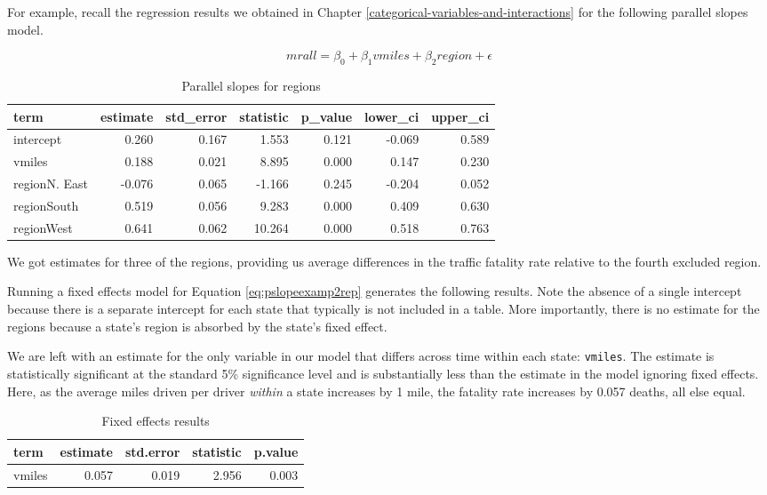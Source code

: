 \documentclass[
]{book}
\begin{document}
For example, recall the regression results we obtained in Chapter \ref{categorical-variables-and-interactions} for the following parallel slopes model.

\begin{equation}
mrall = \beta_0 + \beta_1vmiles + \beta_2region + \epsilon
\label{eq:pslopeexamp2rep}
\end{equation}

\begin{table}

\caption{\label{tab:psloperesults2rep}Parallel slopes for regions}
\centering
\begin{tabular}[t]{l|r|r|r|r|r|r}
\hline
term & estimate & std\_error & statistic & p\_value & lower\_ci & upper\_ci\\
\hline
intercept & 0.260 & 0.167 & 1.553 & 0.121 & -0.069 & 0.589\\
\hline
vmiles & 0.188 & 0.021 & 8.895 & 0.000 & 0.147 & 0.230\\
\hline
regionN. East & -0.076 & 0.065 & -1.166 & 0.245 & -0.204 & 0.052\\
\hline
regionSouth & 0.519 & 0.056 & 9.283 & 0.000 & 0.409 & 0.630\\
\hline
regionWest & 0.641 & 0.062 & 10.264 & 0.000 & 0.518 & 0.763\\
\hline
\end{tabular}
\end{table}

We got estimates for three of the regions, providing us average differences in the traffic fatality rate relative to the fourth excluded region.

Running a fixed effects model for Equation \eqref{eq:pslopeexamp2rep} generates the following results. Note the absence of a single intercept because there is a separate intercept for each state that typically is not included in a table. More importantly, there is no estimate for the regions because a state's region is absorbed by the state's fixed effect.

We are left with an estimate for the only variable in our model that differs across time within each state: \texttt{vmiles}. The estimate is statistically significant at the standard 5\% significance level and is substantially less than the estimate in the model ignoring fixed effects. Here, as the average miles driven per driver \emph{within} a state increases by 1 mile, the fatality rate increases by 0.057 deaths, all else equal.

\begin{table}

\caption{\label{tab:unnamed-chunk-62}Fixed effects results}
\centering
\begin{tabular}[t]{l|r|r|r|r}
\hline
term & estimate & std.error & statistic & p.value\\
\hline
vmiles & 0.057 & 0.019 & 2.956 & 0.003\\
\hline
\end{tabular}
\end{table}
\end{document}
